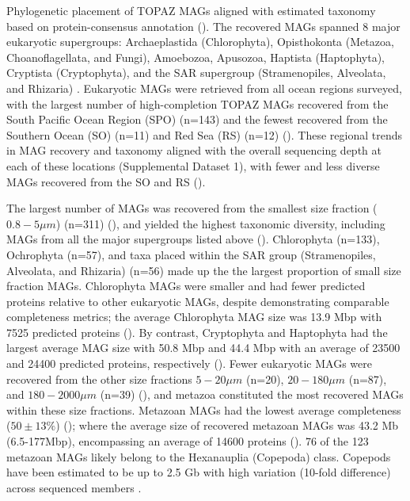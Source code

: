 \documentclass[12pt]{article}
\numberwithin{equation}{section}
\begin{document}


Phylogenetic placement of TOPAZ MAGs aligned with estimated taxonomy based on protein-consensus annotation (). The recovered MAGs spanned 8 major eukaryotic supergroups: Archaeplastida (Chlorophyta), Opisthokonta (Metazoa, Choanoflagellata, and Fungi), Amoebozoa, Apusozoa, Haptista (Haptophyta), Cryptista (Cryptophyta), and the SAR supergroup (Stramenopiles, Alveolata, and Rhizaria) \citep{Burki_2020}. Eukaryotic MAGs were retrieved from all ocean regions surveyed, with the largest number of high-completion TOPAZ MAGs recovered from the South Pacific Ocean Region (SPO) (n=143) and the fewest recovered from the Southern Ocean (SO) (n=11) and Red Sea (RS) (n=12) (). These regional trends in MAG recovery and taxonomy aligned  with the overall sequencing depth at each of these locations (Supplemental Dataset 1), with fewer and less diverse MAGs recovered from the SO and RS ().

The largest number of MAGs was recovered from the smallest size fraction ($0.8-5 \mu m$) (n=311) (), and yielded the highest taxonomic diversity, including MAGs from all the major supergroups listed above (). Chlorophyta (n=133), Ochrophyta (n=57), and taxa placed within the SAR group (Stramenopiles, Alveolata, and Rhizaria) (n=56) made up the  the largest proportion of small size fraction MAGs. Chlorophyta MAGs were smaller and had fewer predicted proteins relative to other eukaryotic MAGs, despite demonstrating comparable completeness metrics; the average Chlorophyta MAG size was 13.9 Mbp with 7525 predicted proteins (). By contrast, Cryptophyta and Haptophyta had the largest average MAG size with 50.8 Mbp and 44.4 Mbp with an average of 23500 and 24400 predicted proteins, respectively (). Fewer eukaryotic MAGs were recovered from the other size fractions $5-20\mu m$ (n=20), $20-180 \mu m$ (n=87), and $180-2000\mu m$ (n=39) (), and metazoa constituted the most recovered MAGs within these size fractions. Metazoan MAGs had the lowest average completeness ($50 \pm 13\%$) (); where the average size of recovered metazoan MAGs was 43.2 Mb (6.5-177Mbp), encompassing an average of 14600 proteins (). 76 of the 123 metazoan MAGs likely belong to the  Hexanauplia (Copepoda) class. Copepods have been estimated to be up to 2.5 Gb with high variation (10-fold difference) across sequenced members \citep{Jorgensen_2019}. 
\end{document}
